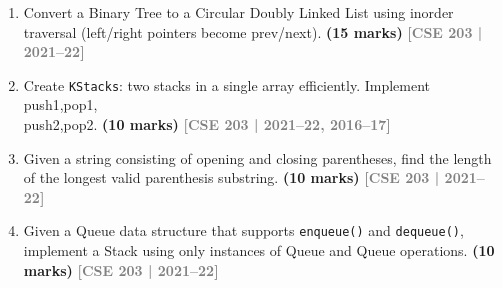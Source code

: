 \documentclass[12pt,a3paper]{article}
\newcommand{\yr}[1]{\hfill\textcolor{gray}{\small\textbf{[#1]}}}
\newcommand{\mk}[1]{\textcolor{orange!70!black}{\small\textbf{(#1 marks)}}}
\begin{document}
\begin{enumerate}
\begin{itemize}
  \item \texttt{push(item)} --- push a positive integer, \textit{item} in the stack. If there is an error (e.g., no more space available for growing the stack in the list), it should output an appropriate error message and return with $-1$.
  \item \texttt{pop()} --- pop an element from the stack. If there is an error, it should output an appropriate error message and return with $-1$.
  \item \texttt{enqueue(item)} --- enqueue a positive integer, \textit{item} in the queue. If there is an error (e.g., no more space available for growing the queue in the list), it should output an appropriate error message and return with $-1$.
  \item \texttt{dequeue()} --- dequeue an element from the queue. If there is an error, it should output an appropriate error message and return with $-1$.
\end{itemize}
\mk{25}
\yr{CSE 105 | 2021--22}

\item Convert a Binary Tree to a Circular Doubly Linked List using inorder
traversal (left/right pointers become prev/next). \mk{15}
\yr{CSE 203 | 2021--22}

\item Create \texttt{KStacks}: two stacks in a single array efficiently. Implement push1,pop1,\\push2,pop2. \mk{10}
\yr{CSE 203 | 2021--22, 2016--17}


\item Given a string consisting of opening and closing parentheses, find the length of the longest valid parenthesis substring. \mk{10}
\yr{CSE 203 | 2021--22}

\item Given a Queue data structure that supports \texttt{enqueue()} and \texttt{dequeue()}, implement a Stack using only instances of Queue and Queue operations. \mk{10}
\yr{CSE 203 | 2021--22}


\end{enumerate}
\end{document}
